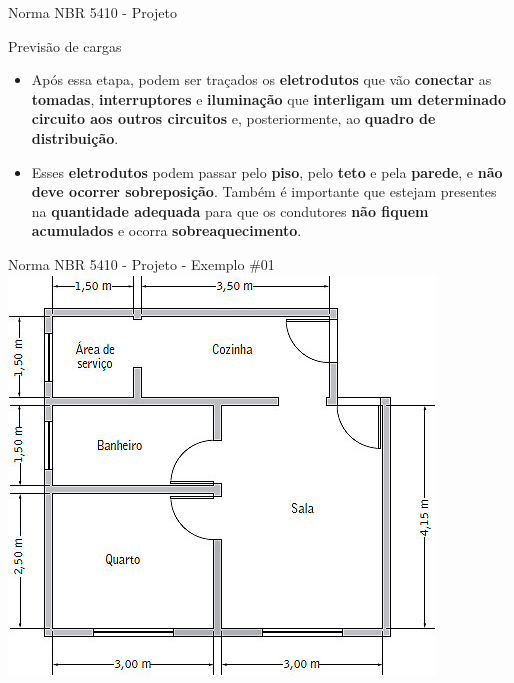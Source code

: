 \begin{frame}{Norma NBR 5410 - Projeto}
	\begin{block}{Previsão de cargas}
		\begin{itemize}
			\item Após essa etapa, podem ser traçados os \textbf{eletrodutos} que vão \textbf{conectar} as \textbf{tomadas}, \textbf{interruptores} e \textbf{iluminação} que \textbf{interligam um determinado circuito aos outros circuitos} e, posteriormente, ao \textbf{quadro de distribuição}.
			\item Esses \textbf{eletrodutos} podem passar pelo \textbf{piso}, pelo \textbf{teto} e pela \textbf{parede}, e \textbf{não deve ocorrer sobreposição}. Também é importante que estejam presentes na \textbf{quantidade adequada} para que os condutores \textbf{não fiquem acumulados} e ocorra \textbf{sobreaquecimento}.
		\end{itemize}
	\end{block}
\end{frame}


\begin{frame}{Norma NBR 5410 - Projeto - Exemplo \#01}
	\centering
	\includegraphics[width=0.7\linewidth]{Figuras/Ch02/fig3}
\end{frame}


